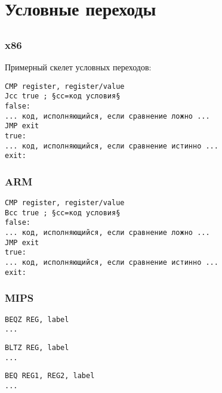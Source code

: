 \section{Условные переходы}
\label{sec:Jcc}






\subsection{\Conclusion{}}

\subsubsection{x86}

Примерный скелет условных переходов:

\begin{lstlisting}[caption=x86]
CMP register, register/value
Jcc true ; §cc=код условия§
false:
... код, исполняющийся, если сравнение ложно ...
JMP exit 
true:
... код, исполняющийся, если сравнение истинно ...
exit:
\end{lstlisting}

\subsubsection{ARM}

\begin{lstlisting}[caption=ARM]
CMP register, register/value
Bcc true ; §cc=код условия§
false:
... код, исполняющийся, если сравнение ложно ...
JMP exit 
true:
... код, исполняющийся, если сравнение истинно ...
exit:
\end{lstlisting}

\subsubsection{MIPS}

\begin{lstlisting}[caption=Проверка на ноль]
BEQZ REG, label
...
\end{lstlisting}

\begin{lstlisting}[caption=Меньше ли нуля?]
BLTZ REG, label
...
\end{lstlisting}

\begin{lstlisting}[caption=Проверка на равенство]
BEQ REG1, REG2, label
...
\end{lstlisting}

